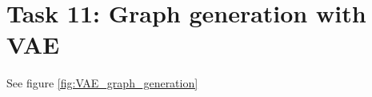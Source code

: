 \documentclass[a4paper]{article}
\begin{document}








% 
% 

\section*{Task 11: Graph generation with VAE}
See figure \ref{fig:VAE_graph_generation}
\end{document}

